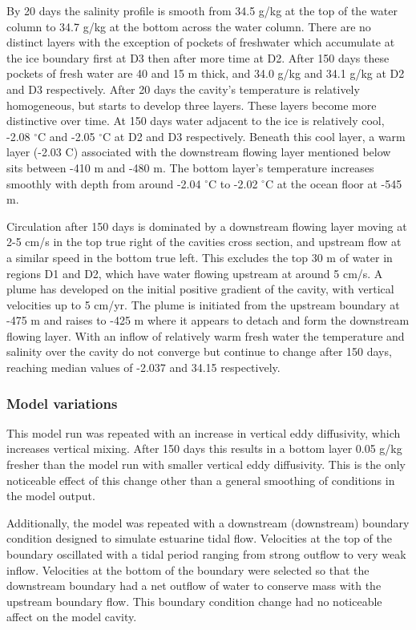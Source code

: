 By 20 days the salinity profile is smooth from 34.5  g/kg at the top of the water column to 34.7 g/kg at the bottom across the water column. There are no distinct layers with the exception of pockets of freshwater which accumulate at the ice boundary first at D3 then after more time at D2. After 150 days these pockets of fresh water are 40 and 15 m thick, and 34.0 g/kg and 34.1 g/kg at D2 and D3 respectively. After 20 days the cavity's temperature is relatively homogeneous, but starts to develop three layers. These layers become more distinctive over time. At 150 days water adjacent to the ice is relatively cool, -2.08 $^{\circ}$C and -2.05 $^{\circ}$C at D2 and D3 respectively. Beneath this cool layer, a warm layer (-2.03 \textdegree C) associated with the downstream flowing layer mentioned below sits between -410 m and -480 m. The bottom layer's temperature increases smoothly with depth from around -2.04 $^{\circ}$C to -2.02 $^{\circ}$C at the ocean floor at -545 m.  

Circulation after 150 days is dominated by a downstream flowing layer moving at 2-5 cm/s in the top true right of the cavities cross section, and upstream flow at a similar speed in the bottom true left.  This excludes the top 30 m of water in regions D1 and D2, which have water flowing upstream at around 5 cm/s. 
A plume has developed on the initial positive gradient of the cavity, with vertical velocities up to 5 cm/yr. The plume is initiated from the upstream boundary at -475 m and raises to -425 m where it appears to detach and form the downstream flowing layer.
With an inflow of relatively warm fresh  water the temperature and salinity over the cavity do not converge but continue to change after 150 days, reaching median values of -2.037 and 34.15 respectively.

\subsubsection{Model variations}
This model run was repeated with an increase in vertical eddy diffusivity, which increases vertical mixing. After 150 days this results in a bottom layer 0.05  g/kg fresher than the model run with smaller vertical eddy diffusivity. This is the only noticeable effect of this change other than a general smoothing of conditions in the model output. 

Additionally, the model was repeated with a downstream (downstream) boundary condition designed to simulate estuarine tidal flow. Velocities at the top of the boundary oscillated with a tidal period ranging from strong outflow to very weak inflow. Velocities at the bottom of the boundary were selected so that the downstream boundary had a net outflow of water to conserve mass with the upstream boundary flow. This boundary condition change had no noticeable affect on the model cavity.

